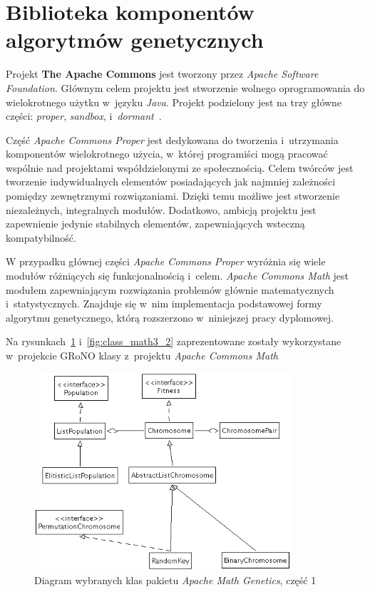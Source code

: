 \documentclass[twoside,12pt]{report}
\begin{document}
\section{Biblioteka komponentów algorytmów genetycznych}
Projekt \textbf{The Apache Commons} jest tworzony przez \textit{Apache Software Foundation}. Głównym celem projektu jest stworzenie wolnego oprogramowania do wielokrotnego użytku w~języku \textit{Java}. Projekt podzielony jest na trzy główne części: \textit{proper}, \textit{sandbox}, i~\textit{dormant}~\cite{math}.

Część \textit{ Apache Commons Proper} jest dedykowana do tworzenia i~utrzymania komponentów wielokrotnego użycia, w~której programiści mogą pracować wspólnie nad projektami współdzielonymi ze społecznością. Celem twórców jest tworzenie indywidualnych elementów posiadających jak najmniej zależności pomiędzy zewnętrznymi rozwiązaniami. Dzięki temu możliwe jest stworzenie niezależnych, integralnych modułów. Dodatkowo, ambicją projektu jest zapewnienie jedynie stabilnych elementów, zapewniających wsteczną kompatybilność.

W przypadku głównej części\textit{ Apache Commons Proper} wyróżnia się wiele modułów różniących się funkcjonalnością i~celem. \textit{Apache Commons Math} jest modułem zapewniającym rozwiązania problemów głównie matematycznych i~statystycznych. Znajduje się w~nim implementacja podstawowej formy algorytmu genetycznego, którą rozszerzono w~niniejszej pracy dyplomowej.

Na rysunkach~\ref{fig:class_math3_1} i~\ref{fig:class_math3_2} zaprezentowane zostały wykorzystane w~projekcie GRoNO klasy z~projektu \textit{Apache Commons Math} 

\begin{figure}[htbp]
	\centering
	\includegraphics[width=0.85\textwidth]{img/math3-1}
	\caption{Diagram wybranych klas pakietu \textit{Apache Math Genetics}, część 1}
	\label{fig:class_math3_1}
\end{figure}
\end{document}
